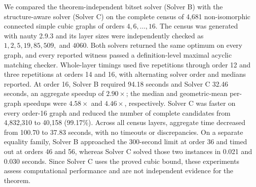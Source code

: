We compared the theorem-independent bitset solver (Solver B) with the structure-aware solver (Solver C) on the complete census of 4,681 non-isomorphic connected simple cubic graphs of orders $4,6,\ldots,16$.  The census was generated with nauty 2.9.3 and its layer sizes were independently checked as $1,2,5,19,85,509,$ and $4060$.  Both solvers returned the same optimum on every graph, and every reported witness passed a definition-level maximal acyclic matching checker.  Whole-layer timings used five repetitions through order 12 and three repetitions at orders 14 and 16, with alternating solver order and medians reported.  At order 16, Solver B required 94.18 seconds and Solver C 32.46 seconds, an aggregate speedup of $2.90\times$; the median and geometric-mean per-graph speedups were $4.58\times$ and $4.46\times$, respectively.  Solver C was faster on every order-16 graph and reduced the number of complete candidates from 4,832,310 to 40,158 (99.17\%).  Across all census layers, aggregate time decreased from 100.70 to 37.83 seconds, with no timeouts or discrepancies.  On a separate equality family, Solver B approached the 300-second limit at order 36 and timed out at orders 46 and 56, whereas Solver C solved those two instances in 0.021 and 0.030 seconds.  Since Solver C uses the proved cubic bound, these experiments assess computational performance and are not independent evidence for the theorem.
